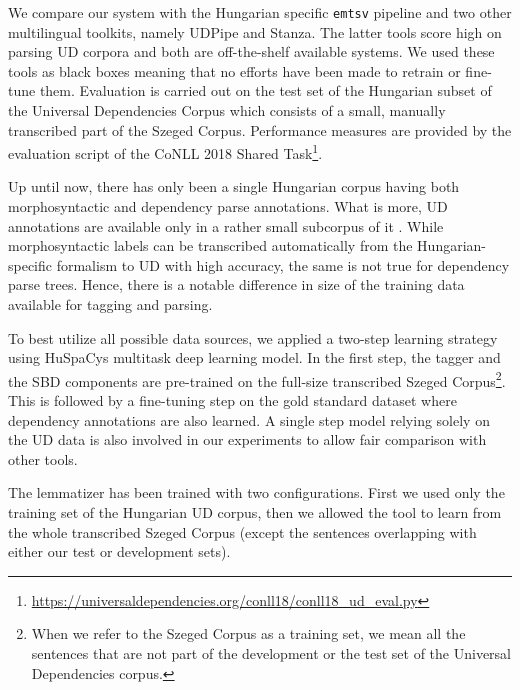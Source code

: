 \documentclass{llncs}
\newcommand{\emtsv}{\texttt{emtsv}}
\newcommand{\udpipe}{UDPipe}
\newcommand{\stanza}{Stanza}
\newcommand{\huspacy}{HuSpaCy}
\begin{document}
We compare our system with the Hungarian specific \emtsv{} pipeline and two other multilingual toolkits, namely \udpipe{} and \stanza{}. The latter tools score high on parsing UD corpora and both are off-the-shelf available systems. We used these tools as black boxes meaning that no efforts have been made to retrain or fine-tune them. Evaluation is carried out on the test set of the Hungarian subset of the Universal Dependencies Corpus \citep{UniDep} which consists of a small, manually transcribed part of the Szeged Corpus. Performance measures are provided by the evaluation script of the CoNLL 2018 Shared Task\footnote{\url{https://universaldependencies.org/conll18/conll18_ud_eval.py}}.

Up until now, there has  only been a single Hungarian corpus \citep{szegedcorpus} having both morphosyntactic and dependency parse annotations. What is more, UD annotations are available only in a rather small subcorpus of it \citep{UniDep}. While morphosyntactic labels can be transcribed automatically from the Hungarian-specific formalism to UD with high accuracy, the same is not true for dependency parse trees. Hence, there is a notable difference in size of the training data available for tagging and parsing.

To best utilize all possible data sources, we applied a two-step learning strategy
using \huspacy\textquotesingle s multitask deep learning model. In the first step, the tagger and the SBD components are pre-trained on the full-size transcribed Szeged Corpus\footnote{When we refer to the Szeged Corpus as a training set, we mean all the sentences that are not part of the development or the test set of the Universal Dependencies corpus.}. This is followed by a fine-tuning step on the gold standard dataset where dependency annotations are also learned. A single step model relying solely on the UD data is also involved in our experiments to allow fair comparison with other tools. 

The lemmatizer has been trained with two configurations. First we used only the training set of the Hungarian UD corpus, then we allowed the tool to learn from the whole transcribed Szeged Corpus (except the sentences overlapping with either our test or development sets).
\end{document}
